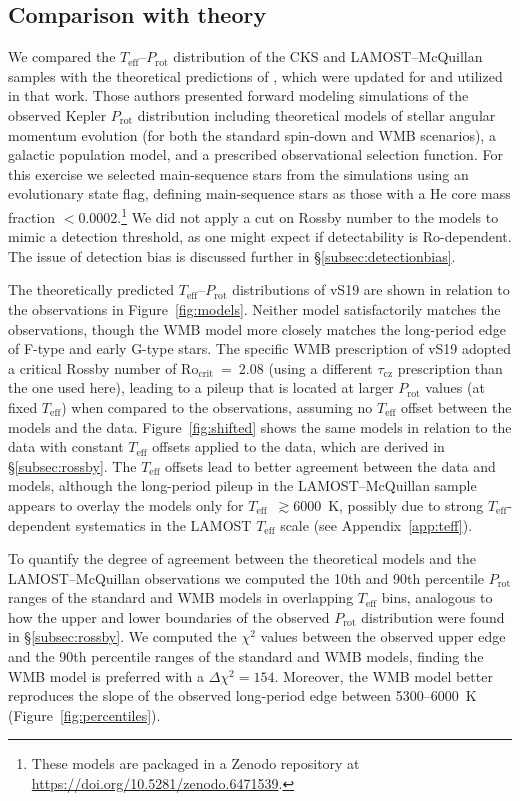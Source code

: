 \documentclass[trackchanges,twocolumn]{aastex631}
\newcommand{\taucz}{$\tau_\mathrm{cz}$\xspace}
\newcommand{\rocrit}{$\mathrm{Ro_{crit}}$\xspace}
\newcommand{\lamostmcq}{LAMOST--McQuillan\xspace}
\newcommand{\jvs}{vS19\xspace}
\newcommand{\teff}{\ensuremath{T_{\mathrm{eff}}}\xspace}
\newcommand{\prot}{\ensuremath{P_\mathrm{rot}}\xspace}
\begin{document}
\subsection{Comparison with theory}
\label{subsec:models}

We compared the \teff--\prot distribution of the CKS and \lamostmcq samples with the theoretical predictions of \citet{vanSaders2019}, which were updated for \citet{Hall2021} and utilized in that work. Those authors presented forward modeling simulations of the observed Kepler \prot distribution including theoretical models of stellar angular momentum evolution (for both the standard spin-down and WMB scenarios), a galactic population model, and a prescribed observational selection function. For this exercise we selected main-sequence stars from the simulations using an evolutionary state flag, defining main-sequence stars as those with a He core mass fraction $<$0.0002.\footnote{These models are packaged in a Zenodo repository at \url{https://doi.org/10.5281/zenodo.6471539}.} We did not apply a cut on Rossby number to the models to mimic a detection threshold, as one might expect if detectability is Ro-dependent. The issue of detection bias is discussed further in \S\ref{subsec:detectionbias}.

The theoretically predicted \teff--\prot distributions of \jvs are shown in relation to the observations in Figure~\ref{fig:models}. Neither model satisfactorily matches the observations, though the WMB model more closely matches the long-period edge of F-type and early G-type stars. The specific WMB prescription of \jvs adopted a critical Rossby number of \rocrit~=~2.08 (using a different \taucz prescription than the one used here), leading to a pileup that is located at larger \prot values (at fixed \teff) when compared to the observations, assuming no \teff offset between the models and the data. Figure~\ref{fig:shifted} shows the same models in relation to the data with constant \teff offsets applied to the data, which are derived in \S\ref{subsec:rossby}. The \teff offsets lead to better agreement between the data and models, although the long-period pileup in the \lamostmcq sample appears to overlay the models only for \teff~$\gtrsim 6000$~K, possibly due to strong \teff-dependent systematics in the LAMOST \teff scale (see Appendix~\ref{app:teff}).

To quantify the degree of agreement between the theoretical models and the \lamostmcq observations we computed the 10th and 90th percentile \prot ranges of the standard and WMB models in overlapping \teff bins, analogous to how the upper and lower boundaries of the observed \prot distribution were found in \S\ref{subsec:rossby}. We computed the $\chi^2$ values between the observed upper edge and the 90th percentile ranges of the standard and WMB models, finding the WMB model is preferred with a $\Delta \chi^2 = 154$. Moreover, the WMB model better reproduces the slope of the observed long-period edge between 5300--6000~K (Figure~\ref{fig:percentiles}). 
\end{document}
